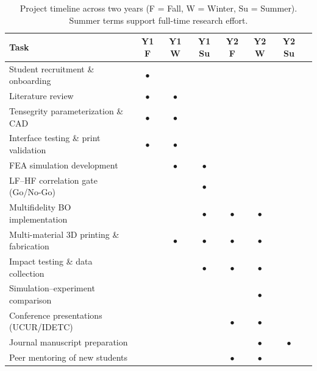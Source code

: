 \documentclass[11pt]{article}
\begin{document}
\begin{table}[ht]
\centering
\small
\begin{tabular}{@{}lccccccc@{}}
\toprule
\textbf{Task} & \textbf{Y1 F} & \textbf{Y1 W} & \textbf{Y1 Su} & \textbf{Y2 F} & \textbf{Y2 W} & \textbf{Y2 Su} \\
\midrule
Student recruitment \& onboarding    & \(\bullet\) &           &           &           &           &           \\
Literature review                     & \(\bullet\) & \(\bullet\) &           &           &           &           \\
Tensegrity parameterization \& CAD   & \(\bullet\) & \(\bullet\) &           &           &           &           \\
Interface testing \& print validation & \(\bullet\) & \(\bullet\) &           &           &           &           \\
FEA simulation development           &             & \(\bullet\) & \(\bullet\) &           &           &           \\
LF--HF correlation gate (Go/No-Go)   &             &             & \(\bullet\) &           &           &           \\
Multifidelity BO implementation      &             &             & \(\bullet\) & \(\bullet\) & \(\bullet\) &           \\
Multi-material 3D printing \& fabrication &        & \(\bullet\) & \(\bullet\) & \(\bullet\) & \(\bullet\) &           \\
Impact testing \& data collection    &             &             & \(\bullet\) & \(\bullet\) & \(\bullet\) &           \\
Simulation--experiment comparison    &             &             &             &             & \(\bullet\) &           \\
Conference presentations (UCUR/IDETC)&             &             &             & \(\bullet\) & \(\bullet\) &           \\
Journal manuscript preparation       &             &             &             &             & \(\bullet\) & \(\bullet\) \\
Peer mentoring of new students       &             &             &             & \(\bullet\) & \(\bullet\) &           \\
\bottomrule
\end{tabular}
\caption{Project timeline across two years (F = Fall, W = Winter, Su = Summer).  Summer terms support full-time research effort.}
\label{tab:timeline}
\end{table}
\end{document}
